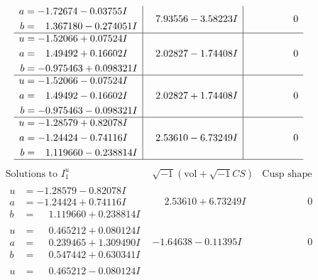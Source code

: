 \documentclass[1p]{elsarticle_modified}
\theoremstyle{definition}
\newcommand{\I}{\sqrt{-1}}
\begin{document}
$$\begin{array}{c|c|c}
\begin{aligned}
a &= -1.72674 - 0.03755 I \\
b &= \phantom{-}1.367180 - 0.274051 I\end{aligned}
 & \phantom{-}7.93556 - 3.58223 I & \phantom{-0.000000 } 0 \\ \hline\begin{aligned}
u &= -1.52066 + 0.07524 I \\
a &= \phantom{-}1.49492 + 0.16602 I \\
b &= -0.975463 + 0.098321 I\end{aligned}
 & \phantom{-}2.02827 - 1.74408 I & \phantom{-0.000000 } 0 \\ \hline\begin{aligned}
u &= -1.52066 - 0.07524 I \\
a &= \phantom{-}1.49492 - 0.16602 I \\
b &= -0.975463 - 0.098321 I\end{aligned}
 & \phantom{-}2.02827 + 1.74408 I & \phantom{-0.000000 } 0 \\ \hline\begin{aligned}
u &= -1.28579 + 0.82078 I \\
a &= -1.24424 - 0.74116 I \\
b &= \phantom{-}1.119660 - 0.238814 I\end{aligned}
 & \phantom{-}2.53610 - 6.73249 I & \phantom{-0.000000 } 0\\
 \hline 
 \end{array}$$\newpage$$\begin{array}{c|c|c}  
\text{Solutions to }I^u_{1}& \I (\text{vol} + \sqrt{-1}CS) & \text{Cusp shape}\\
 \hline 
\begin{aligned}
u &= -1.28579 - 0.82078 I \\
a &= -1.24424 + 0.74116 I \\
b &= \phantom{-}1.119660 + 0.238814 I\end{aligned}
 & \phantom{-}2.53610 + 6.73249 I & \phantom{-0.000000 } 0 \\ \hline\begin{aligned}
u &= \phantom{-}0.465212 + 0.080124 I \\
a &= \phantom{-}0.239465 + 1.309490 I \\
b &= \phantom{-}0.547442 + 0.630341 I\end{aligned}
 & -1.64638 - 0.11395 I & \phantom{-0.000000 } 0 \\ \hline\begin{aligned}
u &= \phantom{-}0.465212 - 0.080124 I \\

\end{aligned}
\end{array}$$
\end{document}
